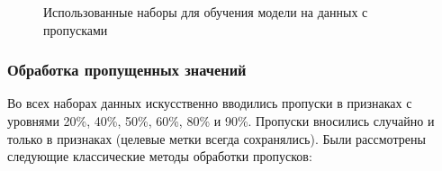 \begin{figure}[ht]
    \caption{Использованные наборы для обучения модели на данных с пропусками}
    \label{fig:missed_datasets}
\end{figure}

\subsubsection{Обработка пропущенных значений}
Во всех наборах данных искусственно вводились пропуски в признаках с уровнями 20\%, 40\%, 50\%, 60\%, 80\% и 90\%. Пропуски вносились случайно и только в признаках (целевые метки всегда сохранялись). Были рассмотрены следующие классические методы обработки пропусков:

